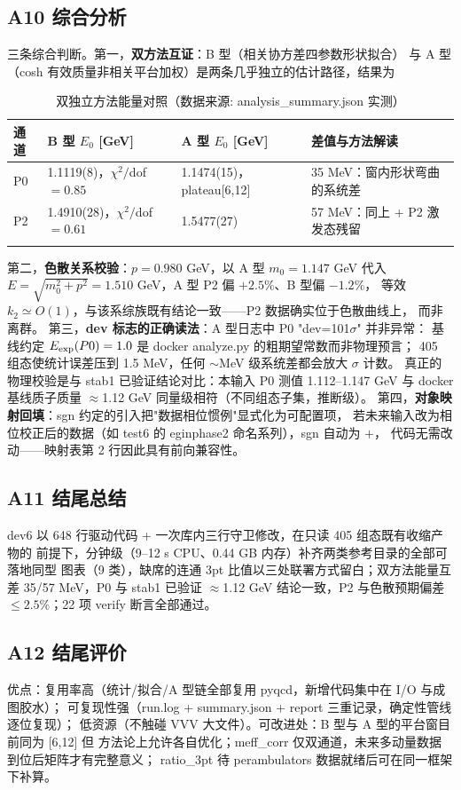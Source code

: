 \documentclass[UTF8]{ctexart}
\begin{document}
\subsection{A10 综合分析}
三条综合判断。第一，\textbf{双方法互证}：B 型（相关协方差四参数形状拟合）
与 A 型（cosh 有效质量非相关平台加权）是两条几乎独立的估计路径，结果为
\begin{xltabular}{\textwidth}{lXXX}
\toprule
通道 & B 型 $E_0$ [GeV] & A 型 $E_0$ [GeV] & 差值与方法解读 \\
\midrule
\endhead
P0 & 1.1119(8)，$\chi^2/$dof$=0.85$ & 1.1474(15)，plateau[6,12] & 35 MeV：窗内形状弯曲的系统差 \\
P2 & 1.4910(28)，$\chi^2/$dof$=0.61$ & 1.5477(27) & 57 MeV：同上 + P2 激发态残留 \\
\bottomrule
\caption{双独立方法能量对照（数据来源: analysis\_summary.json 实测）}
\end{xltabular}
第二，\textbf{色散关系校验}：$p=0.980$ GeV，以 A 型 $m_0=1.147$ GeV 代入
$E=\sqrt{m_0^2+p^2}=1.510$ GeV，A 型 P2 偏 $+2.5\%$、B 型偏 $-1.2\%$，
等效 $k_2\simeq O(1)$，与该系综族既有结论一致——P2 数据确实位于色散曲线上，
而非离群。
第三，\textbf{dev 标志的正确读法}：A 型日志中 P0 "dev=101$\sigma$" 并非异常：
基线约定 $E_{\rm exp}(P0)=1.0$ 是 docker analyze.py 的粗期望常数而非物理预言；
405 组态使统计误差压到 1.5 MeV，任何 $\sim$MeV 级系统差都会放大 $\sigma$ 计数。
真正的物理校验是与 stab1 已验证结论对比：本输入 P0 测值 1.112--1.147 GeV 与
docker 基线质子质量 $\approx$1.12 GeV 同量级相符（不同组态子集，推断级）。
第四，\textbf{对象映射回填}：sgn 约定的引入把"数据相位惯例"显式化为可配置项，
若未来输入改为相位校正后的数据（如 test6 的 eginphase2 命名系列），sgn 自动为 $+$，
代码无需改动——映射表第 2 行因此具有前向兼容性。
\subsection{A11 结尾总结}
\begin{conclbox}
dev6 以 648 行驱动代码 + 一次库内三行守卫修改，在只读 405 组态既有收缩产物的
前提下，分钟级（9--12 s CPU、0.44 GB 内存）补齐两类参考目录的全部可落地同型
图表（9 类），缺席的连通 3pt 比值以三处联署方式留白；双方法能量互差
35/57 MeV，P0 与 stab1 已验证 $\approx$1.12 GeV 结论一致，P2 与色散预期偏差
$\leq2.5\%$；22 项 verify 断言全部通过。
\end{conclbox}
\subsection{A12 结尾评价}
优点：复用率高（统计/拟合/A 型链全部复用 pyqcd，新增代码集中在 I/O 与成图胶水）；
可复现性强（run.log + summary.json + report 三重记录，确定性管线逐位复现）；
低资源（不触碰 VVV 大文件）。可改进处：B 型与 A 型的平台窗目前同为 [6,12] 但
方法论上允许各自优化；meff\_corr 仅双通道，未来多动量数据到位后矩阵才有完整意义；
ratio\_3pt 待 perambulators 数据就绪后可在同一框架下补算。
\end{document}
